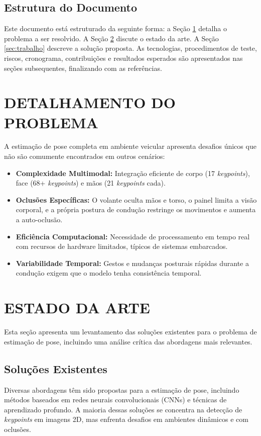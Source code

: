 \documentclass[12pt, a4paper]{article}
\begin{document}
\subsection{Estrutura do Documento}
Este documento está estruturado da seguinte forma: a Seção \ref{sec:problema}
detalha o problema a ser resolvido. A Seção \ref{sec:estado_arte} discute o
estado da arte. A Seção \ref{sec:trabalho} descreve a solução proposta. As
tecnologias, procedimentos de teste, riscos, cronograma, contribuições e
resultados esperados são apresentados nas seções subsequentes, finalizando com
as referências.

\section{DETALHAMENTO DO PROBLEMA}
\label{sec:problema}
A estimação de pose completa em ambiente veicular apresenta desafios únicos que não são comumente encontrados em outros cenários:
\begin{itemize}
    \item \textbf{Complexidade Multimodal:} Integração eficiente de corpo (17 \textit{keypoints}), face (68+ \textit{keypoints}) e mãos (21 \textit{keypoints} cada).
    \item \textbf{Oclusões Específicas:} O volante oculta mãos e torso, o painel limita a visão corporal, e a própria postura de condução restringe os movimentos e aumenta a auto-oclusão.
    \item \textbf{Eficiência Computacional:} Necessidade de processamento em tempo real com recursos de hardware limitados, típicos de sistemas embarcados.
    \item \textbf{Variabilidade Temporal:} Gestos e mudanças posturais rápidas durante a condução exigem que o modelo tenha consistência temporal.
\end{itemize}

\section{ESTADO DA ARTE}
\label{sec:estado_arte}
Esta seção apresenta um levantamento das soluções existentes para o problema de estimação de pose, incluindo uma análise crítica das abordagens mais relevantes.

\subsection{Soluções Existentes}
Diversas abordagens têm sido propostas para a estimação de pose, incluindo
métodos baseados em redes neurais convolucionais (CNNs) e técnicas de
aprendizado profundo. A maioria dessas soluções se concentra na detecção de
\textit{keypoints} em imagens 2D, mas enfrenta desafios em ambientes dinâmicos
e com oclusões.
\end{document}
